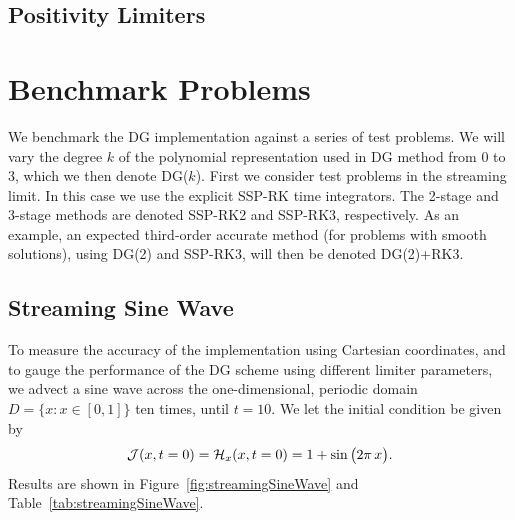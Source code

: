 \documentclass[10pt,preprint]{aastex}
\begin{document}
\subsection{Positivity Limiters}

\section{Benchmark Problems}

We benchmark the DG implementation against a series of test problems.  
We will vary the degree $k$ of the polynomial representation used in DG method from 0 to 3, which we then denote DG($k$).  
First we consider test problems in the streaming limit.  
In this case we use the explicit SSP-RK time integrators.  
The 2-stage and 3-stage methods are denoted SSP-RK2 and SSP-RK3, respectively.  
As an example, an expected third-order accurate method (for problems with smooth solutions), using DG(2) and SSP-RK3, will then be denoted DG(2)+RK3.  

\subsection{Streaming Sine Wave}

To measure the accuracy of the implementation using Cartesian coordinates, and to gauge the performance of the DG scheme using different limiter parameters, we advect a sine wave across the one-dimensional, periodic domain $D=\{x:x\in[0,1]\}$ ten times, until $t=10$.  
We let the initial condition be given by
\begin{equation}
  \mathcal{J}(x,t=0)=\mathcal{H}_{x}(x,t=0)=1+\sin\big(2\pi\,x\big).  
\end{equation}
Results are shown in Figure~\ref{fig:streamingSineWave} and Table~\ref{tab:streamingSineWave}.  
\end{document}
